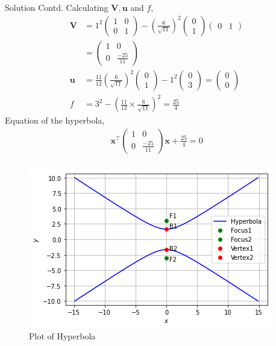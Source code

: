 \documentclass{beamer}
\newcommand{\myvec}[1]{\ensuremath{\begin{pmatrix}#1\end{pmatrix}}}
\providecommand{\brak}[1]{\ensuremath{\left(#1\right)}}
\let\vec\mathbf
\renewcommand{\vec}[1]{\mathbf{#1}}
\begin{document}
\begin{frame}{Solution Contd.}
Calculating $\vec{V}, \vec{u}$ and $f$,
\begin{align}
    \vec{V} &= 1^2\myvec{1&0\\0&1} - \brak{\frac{6}{\sqrt{11}}}^2\myvec{0\\1}\myvec{0&1}\\
    &= \myvec{1&0\\0&\frac{-25}{11}}\\
     \vec{u} &= \frac{11}{12}\brak{\frac{6}{\sqrt{11}}}^2\myvec{0\\1} - 1^2\myvec{0\\3}=\myvec{0\\0}\\
    f &= 3^2 - \brak{\frac{11}{12}\times\frac{6}{\sqrt{11}}}^2 = \frac{25}{4}
\end{align}
Equation of the hyperbola,
\begin{align}
    \vec{x}^{\top}\myvec{1&0\\0&\frac{-25}{11}}\vec{x}+\frac{25}{4}=0
\end{align}
\end{frame}
\begin{frame}{}
\frametitle{}
\begin{figure}[h!]
\centering
\includegraphics[width=\columnwidth]{hyperbola_plot.png}
\caption{Plot of Hyperbola}
\label{fig:hyperbola}
\end{figure}
\end{frame}
\end{document}

